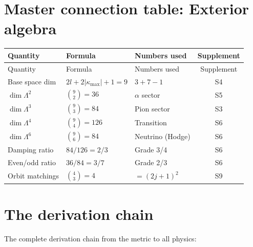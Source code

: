 \documentclass[11pt,letterpaper]{article}
\numberwithin{equation}{section}
\begin{document}
\section{Master connection table: Exterior algebra}
\label{sec:exterior}

\begin{longtable}{p{3cm}p{5cm}p{3cm}c}
\toprule
Quantity & Formula & Numbers used & Supplement \\
\midrule
\endfirsthead
\toprule
Quantity & Formula & Numbers used & Supplement \\
\midrule
\endhead
Base space dim & $2l+2|\kappa_\mathrm{max}|+1 = 9$ & $3+7-1$ & S4 \\
$\dim\Lambda^2$ & $\binom{9}{2} = 36$ & $\alpha$ sector & S5 \\
$\dim\Lambda^3$ & $\binom{9}{3} = 84$ & Pion sector & S3 \\
$\dim\Lambda^4$ & $\binom{9}{4} = 126$ & Transition & S6 \\
$\dim\Lambda^6$ & $\binom{9}{6} = 84$ & Neutrino (Hodge) & S6 \\
Damping ratio & $84/126 = 2/3$ & Grade 3/4 & S6 \\
Even/odd ratio & $36/84 = 3/7$ & Grade 2/3 & S6 \\
Orbit matchings & $\binom{4}{3} = 4$ & $=(2j+1)^2$ & S9 \\
\bottomrule
\end{longtable}

\section{The derivation chain}
\label{sec:chain}

The complete derivation chain from the metric to all physics:
\end{document}
